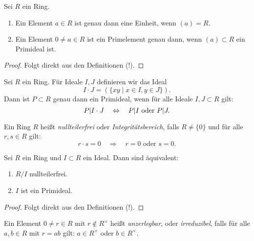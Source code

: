 \documentclass{book}
\begin{document}
\begin{prop}
    \label{prop:elementideal}
    Sei $R$ ein Ring.
    \begin{enumerate}
        \item Ein Element $a \in R$ ist genau dann eine Einheit, wenn $(a) = R$. 
        \item Ein Element $0 \neq a \in R$ ist ein Primelement genau dann, wenn $(a)
            \subset R$ ein Primideal ist. 
    \end{enumerate}
\end{prop}
\begin{proof}
    Folgt direkt aus den Definitionen (!).
\end{proof}

\begin{prob}
    \label{prob:prim}
    Sei $R$ ein Ring. Für Ideale $I,J$ definieren wir das Ideal
    \[
        I \cdot J = (\{ xy \; | \; x \in I, y \in J\}).
    \]
    Dann ist $P \subset R$ genau dann ein Primideal, wenn für alle Ideale $I,J \subset R$ gilt:
    \[
        P | I \cdot J \quad \Leftrightarrow \quad P | I \text{ oder } P | J.
    \]
\end{prob}

\begin{defi}
    \label{defi:integraldomain}
    Ein Ring $R$ heißt \emph{nullteilerfrei} oder \emph{Integritätsbereich}, falls $R \neq \{0\}$ und für alle
    $r,s \in R$ gilt:
    \[
        r \cdot s =0  \quad \Rightarrow \quad \text{$r = 0$ oder $s = 0$}.
    \]
\end{defi}

\begin{prop}
    \label{prop:nullteilerfreiprim}
    Sei $R$ ein Ring und $I \subset R$ ein Ideal. Dann sind äquivalent:
    \begin{enumerate}[label=(\roman*)]
        \item $R/I$ nullteilerfrei. 
        \item $I$ ist ein Primideal.
    \end{enumerate}
\end{prop}
\begin{proof}
    Folgt direkt aus den Definitionen (!).
\end{proof}

\begin{term}
    \label{term:unzerlegbar}
    Ein Element $0 \neq r \in R$ mit $r \notin R^{\times}$ heißt
    \emph{unzerlegbar}, oder \emph{irreduzibel}, falls für alle $a,b \in R$ mit
    $r = ab$ gilt: $a \in R^{\times}$ oder $b \in R^{\times}$.  
\end{term}
\end{document}
